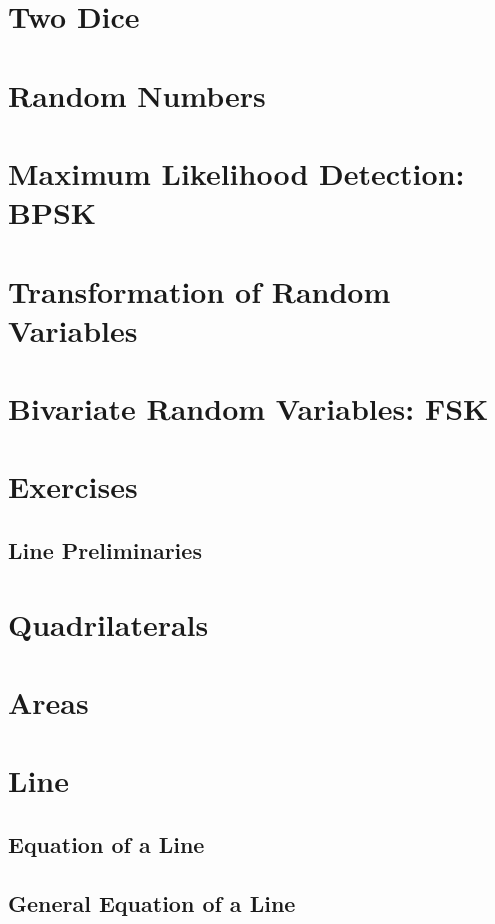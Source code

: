 \documentclass[11pt]{book}
\begin{document}
\chapter{Two Dice}

\chapter{Random Numbers}

\chapter{Maximum Likelihood Detection: BPSK}

\chapter{Transformation of Random Variables}

\chapter{Bivariate Random Variables: FSK}

\chapter{Exercises}


\iffalse
\section{Line Preliminaries}
\chapter{ Quadrilaterals}

\chapter{Areas }
\chapter{Line}
\section{Equation of a Line}
\section{General Equation of a Line}
\end{document}
